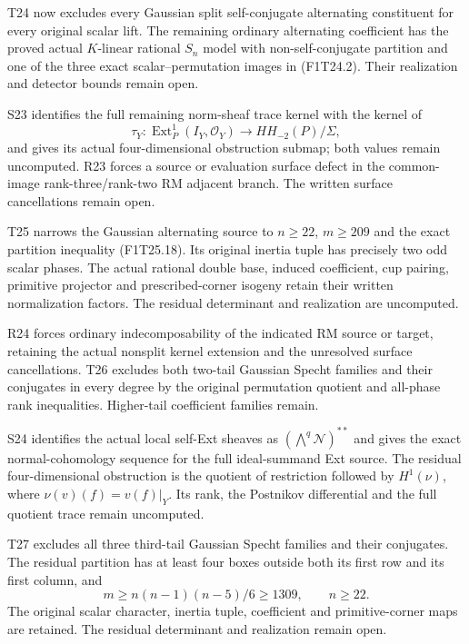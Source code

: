 T24 now excludes every Gaussian split self-conjugate alternating constituent for every original scalar lift. The remaining ordinary alternating coefficient has the proved actual $K$-linear rational $S_n$ model with non-self-conjugate partition and one of the three exact scalar--permutation images in (F1T24.2). Their realization and detector bounds remain open.


S23 identifies the full remaining norm-sheaf trace kernel with the kernel of
\[
 \tau_Y:\operatorname{Ext}^1_P(I_Y,\mathcal O_Y)\longrightarrow HH_{-2}(P)/\Sigma,
\]
and gives its actual four-dimensional obstruction submap; both values remain uncomputed. R23 forces a source or evaluation surface defect in the common-image rank-three/rank-two RM adjacent branch. The written surface cancellations remain open.


T25 narrows the Gaussian alternating source to $n\ge22$, $m\ge209$ and the exact partition inequality (F1T25.18). Its original inertia tuple has precisely two odd scalar phases. The actual rational double base, induced coefficient, cup pairing, primitive projector and prescribed-corner isogeny retain their written normalization factors. The residual determinant and realization are uncomputed.


R24 forces ordinary indecomposability of the indicated RM source or target, retaining the actual nonsplit kernel extension and the unresolved surface cancellations. T26 excludes both two-tail Gaussian Specht families and their conjugates in every degree by the original permutation quotient and all-phase rank inequalities. Higher-tail coefficient families remain.


S24 identifies the actual local self-Ext sheaves as $(\bigwedge^q\mathscr N)^{**}$ and gives the exact normal-cohomology sequence for the full ideal-summand Ext source. The residual four-dimensional obstruction is the quotient of restriction followed by $H^1(\nu)$, where $\nu(v)(f)=v(f)|_Y$. Its rank, the Postnikov differential and the full quotient trace remain uncomputed.



T27 excludes all three third-tail Gaussian Specht families and their conjugates. The residual partition has at least four boxes outside both its first row and its first column, and
\[m\ge n(n-1)(n-5)/6\ge1309,\qquad n\ge22.\]
The original scalar character, inertia tuple, coefficient and primitive-corner maps are retained. The residual determinant and realization remain open.




